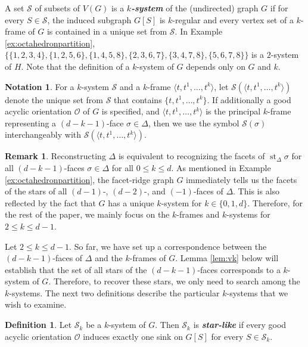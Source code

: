 \documentclass[11pt,twoside]{article}
\theoremstyle{definition}
\newtheorem{definition}[theorem]{Definition}
\newtheorem*{notation*}{Notation}
\newtheorem*{remark*}{Remark}
\newcommand{\cS}{\mathcal{S}}
\newcommand{\cO}{\mathcal{O}}
\DeclareMathOperator{\st}{st}
\begin{document}
A set $\cS$ of subsets of $V(G)$ is a \textbf{\emph{$k$-system}} of the (undirected) graph $G$ if for every $S \in \cS$, the induced subgraph $G[S]$ is $k$-regular and every vertex set of a $k$-frame of $G$ is contained in a unique set from $\cS$. In Example \ref{ex:octahedronpartition}, $\{\{1, 2, 3, 4\}, \{1, 2, 5, 6\}, \{1, 4, 5, 8\}, \{2, 3, 6, 7\}, \{3, 4, 7, 8\}, \{5, 6, 7, 8\}\}$ is a $2$-system of $H$. Note that the definition of a $k$-system of $G$ depends only on $G$ and $k$. 
\begin{notation*}
For a $k$-system $\cS$ and a $k$-frame $\langle t, t^1, \dots, t^k \rangle$, let $\cS(\langle t, t^1, \dots, t^k \rangle)$ denote the unique set from $\cS$ that contains $\{t, t^1, \dots, t^k\}$. If additionally a good acyclic orientation $\cO$ of $G$ is specified, and $\langle t, t^1, \dots, t^k \rangle$ is the principal $k$-frame representing a $(d-k-1)$-face $\sigma \in \Delta$, then we use the symbol $\cS(\sigma)$ interchangeably with $\cS(\langle t, t^1, \dots, t^k \rangle)$. 
\end{notation*}

\begin{remark*}
    Reconstructing $\Delta$ is equivalent to recognizing the facets of $\st_\Delta \sigma$ for all $(d-k-1)$-faces $\sigma \in \Delta$ for all $0 \le k \le d$. As mentioned in Example \ref{ex:octahedronpartition}, the facet-ridge graph $G$ immediately tells us the facets of the stars of all $(d-1)$-, $(d-2)$-, and $(-1)$-faces of $\Delta$. This is also reflected by the fact that $G$ has a unique $k$-system for $k \in \{0, 1, d\}$. Therefore, for the rest of the paper, we mainly focus on the $k$-frames and $k$-systems for $2 \le k \le d-1$.
\end{remark*}


Let $2 \le k \le d-1$. So far, we have set up a correspondence between the $(d-k-1)$-faces of $\Delta$ and the $k$-frames of $G$. Lemma \ref{lem:vk} below will establish that the set of all stars of the $(d-k-1)$-faces corresponds to a $k$-system of $G$. Therefore, to recover these stars, we only need to search among the $k$-systems. The next two definitions describe the particular $k$-systems that we wish to examine. 

\begin{definition}\label{def:starlike}
    Let $\cS_k$ be a $k$-system of $G$. Then $\cS_k$ is \textbf{\emph{star-like}} if every good acyclic orientation $\cO$ induces exactly one sink on $G[S]$ for every $S \in \cS_k$.
\end{definition}
\end{document}

